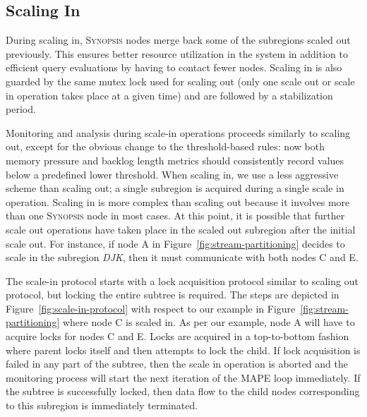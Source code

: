 \subsection{Scaling In}
\label{subsec:scaling-in}
During scaling in, \textsc{Synopsis} nodes merge back some of the subregions scaled out previously.
This ensures better resource utilization in the system in addition to efficient query evaluations by having to contact fewer nodes.
Scaling in is also guarded by the same mutex lock used for scaling out (only one scale out or scale in operation takes place at a given time) and are followed by a stabilization period.

Monitoring and analysis during scale-in operations proceeds similarly to scaling out, except for the obvious change to the threshold-based rules: now both memory pressure and backlog length metrics should consistently record values below a predefined lower threshold.
When scaling in, we use a less aggressive scheme than scaling out; a single subregion is acquired during a single scale in operation.
Scaling in is more complex than scaling out because it involves more than one \textsc{Synopsis} node in most cases.
At this point, it is possible that further scale out operations have taken place in the scaled out subregion after the initial scale out.
For instance, if node A in Figure~\ref{fig:stream-partitioning} decides to scale in the subregion \emph{DJK}, then it must communicate with both nodes C and E.

The scale-in protocol starts with a lock acquisition protocol similar to scaling out protocol, but locking the entire subtree is required.
The steps are depicted in Figure~\ref{fig:scale-in-protocol} with respect to our example in Figure~\ref{fig:stream-partitioning} where node C is scaled in.
As per our example, node A will have to acquire locks for nodes C and E.
Locks are acquired in a top-to-bottom fashion where parent locks itself and then attempts to lock the child.
If lock acquisition is failed in any part of the subtree, then the scale in operation is aborted and the monitoring process will start the next iteration of the MAPE loop immediately.
If the subtree is successfully locked, then data flow to the child nodes corresponding to this subregion is immediately terminated.

